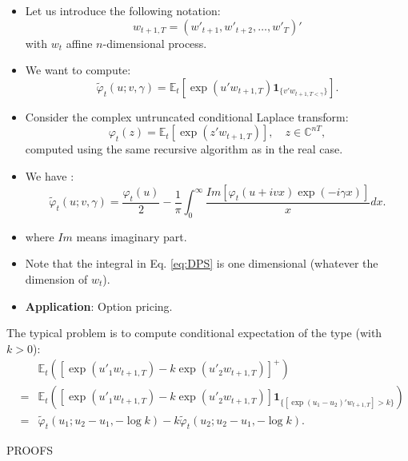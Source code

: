 \documentclass[
  12pt,
]{book}
\theoremstyle{definition}
\theoremstyle{definition}
\theoremstyle{definition}
\theoremstyle{definition}
\theoremstyle{remark}
\begin{document}
\begin{itemize}
\item
  Let us introduce the following notation:
  \[
  w_{t+1,T} = (w'_{t+1}, w'_{t+2},\dots, w'_T)'
  \]
  with \(w_t\) affine \(n\)-dimensional process.
\item
  We want to compute:
  \[
  \tilde{\varphi}_t(u ; v, \gamma) = \mathbb{E}_t[\exp(u'w_{t+1,T})\textbf{1}_{\{v'w_{t+1,T<\gamma}\}}].
  \]
\item
  Consider the complex untruncated conditional Laplace transform:
  \[
  \varphi_t(z) = \mathbb{E}_t[\exp(z'w_{t+1,T})],\quad  z \in \mathbb{C}^{nT},
  \]
  computed using the same recursive algorithm as in the real case.
\item
  We have \citep{Duffie_Pan_Singleton_2000}:
  \begin{equation}
  \tilde{\varphi}_t(u ; v, \gamma) =  \frac{\varphi_t(u)}{2} - \frac{1}{\pi}
   \int^\infty_0 \frac{Im[\varphi_t(u+ivx) \exp(-i\gamma x)]}{x} dx.\label{eq:DPS}
  \end{equation}
\item
  where \(Im\) means imaginary part.
\item
  Note that the integral in Eq. \eqref{eq:DPS} is one dimensional (whatever the dimension of \(w_t\)).
\item
  \textbf{Application}: Option pricing.
\end{itemize}

The typical problem is to compute conditional expectation of the type (with \(k > 0\)):
\begin{eqnarray*}
&& \mathbb{E}_t\left([\exp(u'_1 w_{t+1,T})-k   \exp(u'_2 w_{t+1,T})]^+\right) \\
&= &  \mathbb{E}_t\left([\exp(u'_1 w_{t+1,T})-k   \exp(u'_2 w_{t+1,T})]\textbf{1}_{\{[\exp(u_1-u_2)'w_{t+1,T}] > k \}}\right) \\
&= & \tilde{\varphi}_t(u_1 ; u_2-u_1, - \log   k) - k \tilde{\varphi}_t(u_2 ; u_2-u_1, - \log   k).
\end{eqnarray*}

PROOFS
\end{document}

